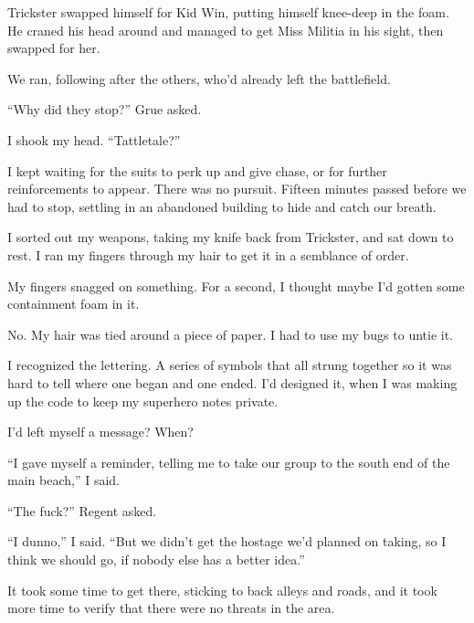Trickster swapped himself for Kid Win, putting himself knee-deep in the foam.  He craned his head around and managed to get Miss Militia in his sight, then swapped for her.



We ran, following after the others, who'd already left the battlefield.



``Why did they stop?'' Grue asked.



I shook my head.  ``Tattletale?''



I kept waiting for the suits to perk up and give chase, or for further reinforcements to appear.  There was no pursuit.  Fifteen minutes passed before we had to stop, settling in an abandoned building to hide and catch our breath.



I sorted out my weapons, taking my knife back from Trickster, and sat down to rest.  I ran my fingers through my hair to get it in a semblance of order.



My fingers snagged on something.  For a second, I thought maybe I'd gotten some containment foam in it.



No.  My hair was tied around a piece of paper.  I had to use my bugs to untie it.



I recognized the lettering.  A series of symbols that all strung together so it was hard to tell where one began and one ended.  I'd designed it, when I was making up the code to keep my superhero notes private.



I'd left myself a message?  When?



``I gave myself a reminder, telling me to take our group to the south end of the main beach,'' I said.



``The fuck?'' Regent asked.



``I dunno,'' I said.  ``But we didn't get the hostage we'd planned on taking, so I think we should go, if nobody else has a better idea.''



\sectionbreak



It took some time to get there, sticking to back alleys and roads, and it took more time to verify that there were no threats in the area.



